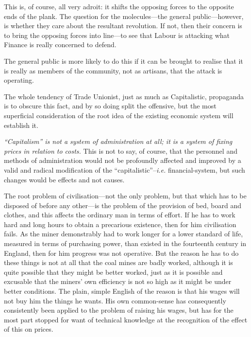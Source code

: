 \documentclass{book}
\begin{document}
This is, of course, all very adroit: it shifts the opposing forces to the opposite ends of the plank. The question for the molecules—the general public—however, is whether they care about the resultant revolution. If not, then their concern is to bring the opposing forces into line—to see that Labour is attacking what Finance is really concerned to defend.

The general public is more likely to do this if it can be brought to realise that it is really as members of the community, not as artisans, that the attack is operating.

The whole tendency of Trade Unionist, just as much as Capitalistic, propaganda is to obscure this fact, and by so doing split the offensive, but the most superficial consideration of the root idea of the existing economic system will establish it.

\emph{“Capitalism” is not a system of administration at all; it is a system of fixing prices in relation to costs.} This is not to say, of course, that the personnel and methods of administration would not be profoundly affected and improved by a valid and radical modification of the “capitalistic”–\emph{i.e.} financial-system, but such changes would be effects and not causes.

The root problem of civilisation—not the only problem, but that which has to be disposed of before any other—is the problem of the provision of bed, board and clothes, and this affects the ordinary man in terms of effort. If he has to work hard and long hours to obtain a precarious existence, then for him civilisation fails. As the miner demonstrably had to work longer for a lower standard of life, measured in terms of purchasing power, than existed in the fourteenth century in England, then for him progress was not operative. But the reason he has to do these things is not at all that the coal mines are badly worked, although it is quite possible that they might be better worked, just as it is possible and excusable that the miners’ own efficiency is not so high as it might be under better conditions. The plain, simple English of the reason is that his wages will not buy him the things he wants. His own common-sense has consequently consistently been applied to the problem of raising his wages, but has for the most part stopped for want of technical knowledge at the recognition of the effect of this on prices.
\end{document}
